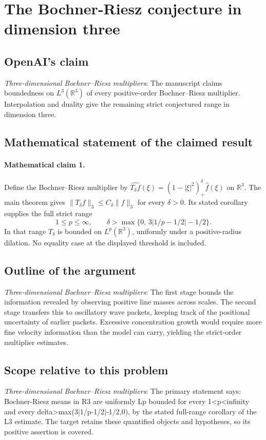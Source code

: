 \documentclass[11pt]{article}
\begin{document}
\section*{The Bochner-Riesz conjecture in dimension three}

\subsection{OpenAI's claim}
\textit{Three-dimensional Bochner--Riesz multipliers}: The manuscript claims boundedness on $L^3(\mathbb R^3)$ of every positive-order Bochner--Riesz multiplier. Interpolation and duality give the remaining strict conjectured range in dimension three.

\subsection{Mathematical statement of the claimed result}
\paragraph{Mathematical claim 1.} Define the Bochner--Riesz multiplier by $\widehat{T_\delta f}(\xi)=(1-|\xi|^2)_+^\delta\widehat f(\xi)$ on $\mathbb R^3$. The main theorem gives $\|T_\delta f\|_3\le C_\delta\|f\|_3$ for every $\delta>0$. Its stated corollary supplies the full strict range \[1\le p\le\infty,\qquad\delta>\max\{0,\,3|1/p-1/2|-1/2\}.\] In that range $T_\delta$ is bounded on $L^p(\mathbb R^3)$, uniformly under a positive-radius dilation. No equality case at the displayed threshold is included.

\subsection{Outline of the argument}
\textit{Three-dimensional Bochner--Riesz multipliers}: The first stage bounds the information revealed by observing positive line masses across scales. The second stage transfers this to oscillatory wave packets, keeping track of the positional uncertainty of earlier packets. Excessive concentration growth would require more fine velocity information than the model can carry, yielding the strict-order multiplier estimates.

\subsection{Scope relative to this problem}
\textit{Three-dimensional Bochner--Riesz multipliers}: The primary statement says: Bochner-Riesz means in R3 are uniformly Lp bounded for every 1<p<infinity and every delta>max(3|1/p-1/2|-1/2,0), by the stated full-range corollary of the L3 estimate. The target retains these quantified objects and hypotheses, so its positive assertion is covered.
\end{document}
